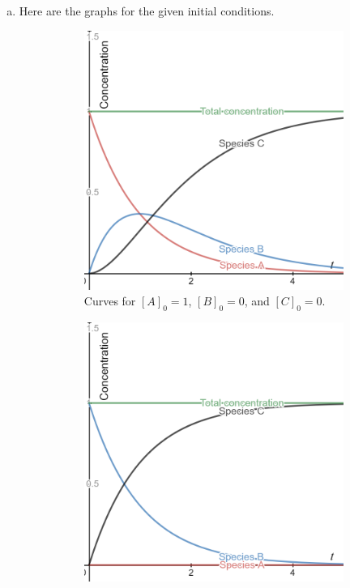 \documentclass[12pt]{article} %
\begin{document}
\begin{solution}
\begin{enumerate}[(a)]
    \item Here are the graphs for the given initial conditions.
    \begin{figure}[H]
        \centering
        \begin{subfigure}[b]{0.3\textwidth}
            \centering
            \includegraphics[width=\textwidth]{a01b00c00.png}
            \caption{Curves for $[A]_0=1$, $[B]_0=0$, and $[C]_0=0$.}
        \end{subfigure}
        \hfill
        \begin{subfigure}[b]{0.3\textwidth}
            \centering
            \includegraphics[width=\textwidth]{a00b01c00.png}

\end{subfigure}
\end{figure}
\end{enumerate}
\end{solution}
\end{document}
